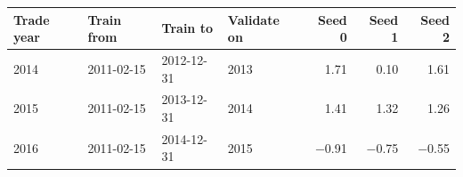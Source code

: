 \begin{tabular}{@{}llllrrr@{}}
\toprule
Trade year & Train from & Train to & Validate on & Seed 0 & Seed 1 & Seed 2\\
\midrule
2014 & 2011-02-15 & 2012-12-31 & 2013 & 1.71 & 0.10 & 1.61\\
2015 & 2011-02-15 & 2013-12-31 & 2014 & 1.41 & 1.32 & 1.26\\
2016 & 2011-02-15 & 2014-12-31 & 2015 & \ensuremath{-}0.91 & \ensuremath{-}0.75 & \ensuremath{-}0.55\\
\bottomrule
\end{tabular}
